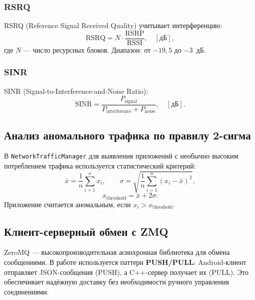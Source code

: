 \documentclass[a4paper,14pt,oneside,openany]{memoir}
\begin{document}
\subsubsection{RSRQ}

RSRQ (Reference Signal Received Quality) учитывает интерференцию:
\begin{equation}
  \mathrm{RSRQ} = N \cdot \frac{\mathrm{RSRP}}{\mathrm{RSSI}},
  \quad [\text{дБ}],
\end{equation}
где $N$ --- число ресурсных блоков. Диапазон: от $-19{,}5$ до $-3$~дБ.

\subsubsection{SINR}

SINR (Signal-to-Interference-and-Noise Ratio):
\begin{equation}
  \mathrm{SINR} = \frac{P_{\mathrm{signal}}}
                       {P_{\mathrm{interference}} + P_{\mathrm{noise}}},
  \quad [\text{дБ}].
\end{equation}

\subsection{Анализ аномального трафика по правилу 2-сигма}

В \texttt{NetworkTrafficManager} для выявления приложений с необычно высоким
потреблением трафика используется статистический критерий:
\begin{equation}
  \bar{x} = \frac{1}{n}\sum_{i=1}^{n} x_i, \qquad
  \sigma = \sqrt{\frac{1}{n}\sum_{i=1}^{n}(x_i - \bar{x})^2},
\end{equation}
\begin{equation}
  x_{\mathrm{threshold}} = \bar{x} + 2\sigma.
\end{equation}
Приложение считается аномальным, если $x_i > x_{\mathrm{threshold}}$.

\subsection{Клиент-серверный обмен с ZMQ}

ZeroMQ --- высокопроизводительная асинхронная библиотека для обмена
сообщениями. В работе используется паттерн \textbf{PUSH/PULL}:
Android-клиент отправляет JSON-сообщения (PUSH), а C++-сервер получает их
(PULL). Это обеспечивает надёжную доставку без необходимости ручного
управления соединениями.
\end{document}
